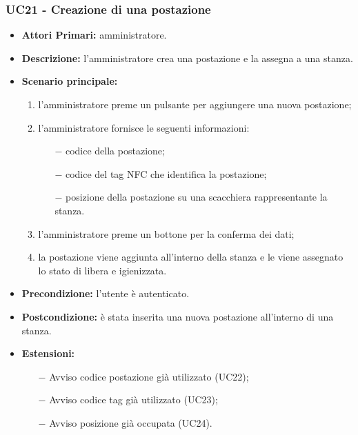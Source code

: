 \subsubsection{UC21 - Creazione di una postazione}
\begin{itemize}
	\item\textbf{Attori Primari:}
	amministratore.
	\item\textbf{Descrizione:}
	l'amministratore crea una postazione e la assegna a una stanza.
	\item\textbf{Scenario principale:} 
	\begin{enumerate}
		\item l'amministratore preme un pulsante per aggiungere una nuova postazione;
		\item l'amministratore fornisce le seguenti informazioni:
		\begin{itemize}
			\item[$-$] codice della postazione;
			\item[$-$] codice del tag NFC che identifica la postazione;
			\item[$-$] posizione della postazione su una scacchiera rappresentante la stanza.
		\end{itemize}
		\item l'amministratore preme un bottone per la conferma dei dati;
		\item la postazione viene aggiunta all'interno della stanza e le viene assegnato lo stato di libera e igienizzata.
	\end{enumerate}
	\item\textbf{Precondizione:} 
	l'utente è autenticato.
	\item\textbf{Postcondizione:}
	è stata inserita una nuova postazione all'interno di una stanza.
	\item\textbf{Estensioni:}
	\begin{itemize}
		\item[$-$] Avviso codice postazione già utilizzato (UC22);
		\item[$-$] Avviso codice tag già utilizzato (UC23);
		\item[$-$] Avviso posizione già occupata (UC24).
	\end{itemize}
\end{itemize}

